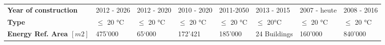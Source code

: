\begin{landscape}
\begin{table}[h]
\begin{tabular}{llllllll}
\textbf{Year of construction}                                                  & 2012 - 2026                                                                        & 2012 - 2020                                                                 & 2010 - 2020                                                                                           & 2011-2050                                                                         & 2013 - 2015                                                              & 2007 - heute                                                          & 2008 - 2016                                                                   \\
\textbf{Type}                                                                  & $\leq$ 20 \si{\celsius}                                                                            & $\leq$ 20 \si{\celsius}                                                                     & $\leq$ 20 \si{\celsius}                                                                                               & $\leq$ 20 \si{\celsius}                                                                           & $\leq$ 20\si{\celsius}                                                                   & $\leq$ 20 \si{\celsius}                                                               & $\leq$ 20 \si{\celsius}                                                                       \\
\textbf{Energy Ref. Area $[m2]$}                                                              & 475'000                                                                            & 65‘000                                                                      & 172'421                                                                                               & 185'000                                                                           & 24 Buildings                                                             & 160'000                                                               & 840'000                                                                       \\

\end{tabular}
\end{table}
\end{landscape}
